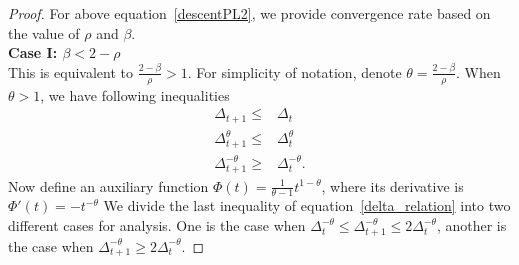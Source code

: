 \documentclass[10pt]{article} %
\def\eqref#1{equation~\ref{#1}}
\newtheorem{proof}{Proof}
\begin{document}
\begin{proof}
For above \eqref{descentPL2}, we provide convergence rate based on the value of $\rho$ and $\beta$.\\
\noindent\textbf{Case I: $\beta<2-\rho$}\\
This is equivalent to $\frac{2-\beta}{\rho}>1$. For simplicity of notation, denote $\theta=\frac{2-\beta}{\rho}$.
When $\theta > 1$, we have following inequalities
\begin{align}
    \Delta_{t+1}\leq& \Delta_t \nonumber\\
    \Delta_{t+1}^{\theta} \leq& \Delta_t^{\theta} \nonumber \\
    \Delta_{t+1}^{-\theta} \geq& \Delta_t^{-\theta}.
    \label{delta_relation}
\end{align}
Now define an auxiliary function $\Phi(t)=\frac{1}{\theta-1}t^{1-\theta}$, where its derivative is $\Phi'(t)=-t^{-\theta}$ 
We divide the last inequality of \eqref{delta_relation} into two different cases for analysis. One is the case when $\Delta_t^{-\theta}\leq\Delta_{t+1}^{-\theta}\leq 2\Delta_t^{-\theta}$, another is the case when $\Delta_{t+1}^{-\theta}\geq 2\Delta_t^{-\theta}$.


\end{proof}
\end{document}
